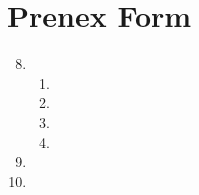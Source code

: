 \section{Prenex Form}

\solutions{}
\begin{enumerate}
  \setcounter{enumi}{7}
  \item %
    \begin{enumerate}
      \item 
      \item 
      \item 
      \item 
    \end{enumerate}
  \item %
  \item %
\end{enumerate}

